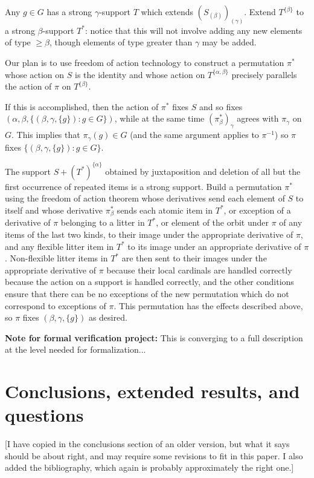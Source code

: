 \documentclass[112pt]{article}
\begin{document}
Any $g \in G$ has a strong $\gamma$-support $T$ which extends $(S_{(\beta)})_{(\gamma)}$.   Extend $T^{\{\beta\}}$ to a strong $\beta$-support $T^*$:  notice
that this will not involve adding any new elements of type $\geq \beta$, though elements of type greater than $\gamma$ may be added.



Our plan is to use freedom of action technology to construct a permutation $\pi^*$ whose action on $S$ is the identity
and whose action on $T^{\{\alpha,\beta\}}$ precisely parallels the action of $\pi$ on $T^{\{\beta\}}$.

If this is accomplished, then the action of $\pi^*$ fixes $S$ and so fixes $(\alpha,\beta,\{(\beta,\gamma,\{g\}):g \in G\})$, while at the same
time $(\pi^*_\beta)_\gamma$ agrees with $\pi_\gamma$ on $G$.  This implies that $\pi_\gamma(g) \in G$ (and the same argument applies to $\pi^{-1}$)
so $\pi$ fixes $\{(\beta,\gamma,\{g\}):g \in G\}$.

The support $S+(T^*)^{\{\alpha\}}$ obtained by juxtaposition and deletion of all but the first occurrence of repeated items is a strong support.  Build a permutation $\pi^*$ using the freedom of action theorem whose derivatives
send each element of $S$ to itself and whose derivative $\pi^*_\beta$ sends each atomic item in $T^*$, or exception of a derivative of $\pi$ belonging to a litter in $T^*$, or element of the orbit under $\pi$ of any items of the last two kinds, to their image under the appropriate derivative of $\pi$, and any flexible litter item in $T^*$ to its image under an appropriate derivative of $\pi$.  Non-flexible litter items in $T^*$ are then sent to their images under the appropriate derivative of $\pi$ because their local cardinals are handled correctly because the action on a support is handled correctly, and the other conditions ensure that there can be no exceptions of the new permutation which do not correspond to exceptions of $\pi$.  This permutation has the effects described above, so $\pi$ fixes $(\beta,\gamma,\{g\})$ as desired.



{\bf Note for formal verification project:}  This is converging to a full description at the level needed for formalization...

\newpage

\section{Conclusions, extended results, and questions}
[I have copied in the conclusions section of an older version, but what it says should be about right, 
and may require some revisions to fit in this paper.  I also added the bibliography, which again is probably approximately the right one.]
\end{document}
